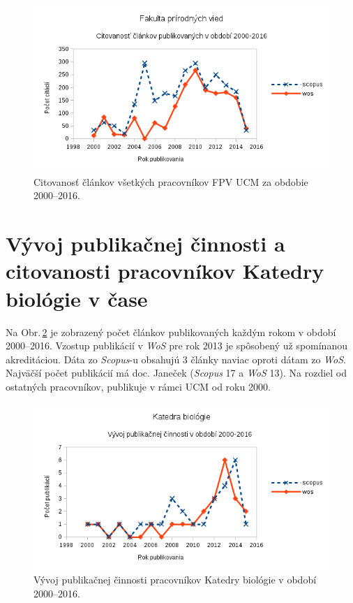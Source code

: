 \begin{figure}
  \centering
  \includegraphics[width=\textwidth]{obr/plot-fns-citations.png}
  \caption{Citovanosť článkov všetkých pracovníkov FPV UCM za obdobie 2000--2016.}
  \label{fig:plot.fns.citations}
\end{figure}



\section{Vývoj publikačnej činnosti a citovanosti pracovníkov Katedry biológie v
  čase}

Na Obr.\,\ref{fig:plot.bio.publications} je zobrazený počet článkov
publikovaných každým rokom v období 2000--2016. Vzostup publikácií v \emph{WoS}
pre rok 2013 je spôsobený už spomínanou akreditáciou. Dáta zo \emph{Scopus}-u
obsahujú 3 články naviac oproti dátam zo \emph{WoS}. Najväčší počet publikácií
má doc. Janeček (\emph{Scopus} 17 a \emph{WoS} 13). Na rozdiel od ostatných
pracovníkov, publikuje v rámci UCM od roku 2000.

\begin{figure}
  \centering
  \includegraphics[width=\textwidth]{obr/plot-bio-publications.png}
  \caption{Vývoj publikačnej činnosti pracovníkov Katedry biológie v období 2000--2016.}
  \label{fig:plot.bio.publications}
\end{figure}

